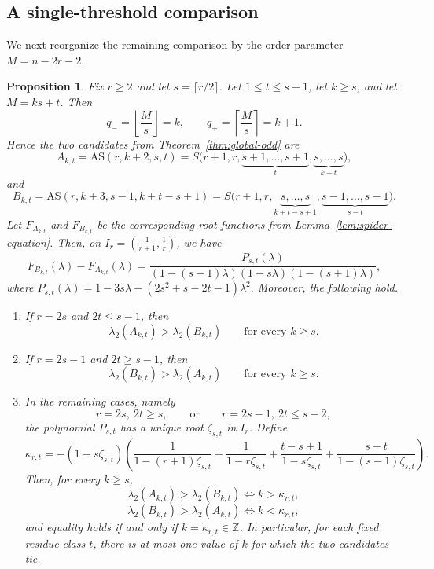 \documentclass[11pt]{article}
\newtheorem{proposition}[theorem]{Proposition}
\theoremstyle{remark}
\newcommand{\AS}{\mathrm{AS}}
\begin{document}
\subsection{A single-threshold comparison}
We next reorganize the remaining comparison by the order parameter $M=n-2r-2$.

\begin{proposition}\label{prop:single-threshold}
Fix $r\ge 2$ and let $s=\lceil r/2\rceil$.
Let $1\le t\le s-1$, let $k\ge s$, and let $M=ks+t$.
Then
$$
q_-=\left\lfloor \frac{M}{s}\right\rfloor=k,
\qquad
q_+=\left\lceil \frac{M}{s}\right\rceil=k+1.
$$
Hence the two candidates from Theorem~\ref{thm:global-odd} are
$$
A_{k,t}=\AS(r,k+2,s,t)
=S\bigl(r+1,r,\underbrace{s+1,\dots,s+1}_{t},\underbrace{s,\dots,s}_{k-t}\bigr),
$$
and
$$
B_{k,t}=\AS(r,k+3,s-1,k+t-s+1)
=S\bigl(r+1,r,\underbrace{s,\dots,s}_{k+t-s+1},\underbrace{s-1,\dots,s-1}_{s-t}\bigr).
$$
Let $F_{A_{k,t}}$ and $F_{B_{k,t}}$ be the corresponding root functions from Lemma~\ref{lem:spider-equation}.
Then, on $I_r=\left(\frac1{r+1},\frac1r\right)$,
we have
\begin{equation}\label{eq:single-threshold-difference}
F_{B_{k,t}}(\lambda)-F_{A_{k,t}}(\lambda)
=
\frac{P_{s,t}(\lambda)}{(1-(s-1)\lambda)(1-s\lambda)(1-(s+1)\lambda)},
\end{equation}
where
$P_{s,t}(\lambda)=1-3s\lambda+(2s^2+s-2t-1)\lambda^2.$
Moreover, the following hold.
\begin{enumerate}[label=\textnormal{(\roman*)}]
    \item If $r=2s$ and $2t\le s-1$, then
    $$
    \lambda_2(A_{k,t})>\lambda_2(B_{k,t})
    \qquad\text{for every }k\ge s.
    $$
    \item If $r=2s-1$ and $2t\ge s-1$, then
    $$
    \lambda_2(B_{k,t})>\lambda_2(A_{k,t})
    \qquad\text{for every }k\ge s.
    $$
    \item In the remaining cases, namely
    $$
    r=2s,\ 2t\ge s,
    \qquad\text{or}\qquad
    r=2s-1,\ 2t\le s-2,
    $$
    the polynomial $P_{s,t}$ has a unique root $\zeta_{s,t}$ in $I_r$.
    Define
    $$
    \kappa_{r,t}
    =-(1-s\zeta_{s,t})\left(
    \frac{1}{1-(r+1)\zeta_{s,t}}
    +\frac{1}{1-r\zeta_{s,t}}
    +\frac{t-s+1}{1-s\zeta_{s,t}}
    +\frac{s-t}{1-(s-1)\zeta_{s,t}}
    \right).
    $$
    Then, for every $k\ge s$,
    $$
    \lambda_2(A_{k,t})>\lambda_2(B_{k,t})\iff k>\kappa_{r,t},
    $$
    $$
    \lambda_2(B_{k,t})>\lambda_2(A_{k,t})\iff k<\kappa_{r,t},
    $$
    and equality holds if and only if $k=\kappa_{r,t}\in\mathbb Z$.
    In particular, for each fixed residue class $t$, there is at most one value of $k$ for which the two candidates tie.
\end{enumerate}
\end{proposition}
\end{document}
